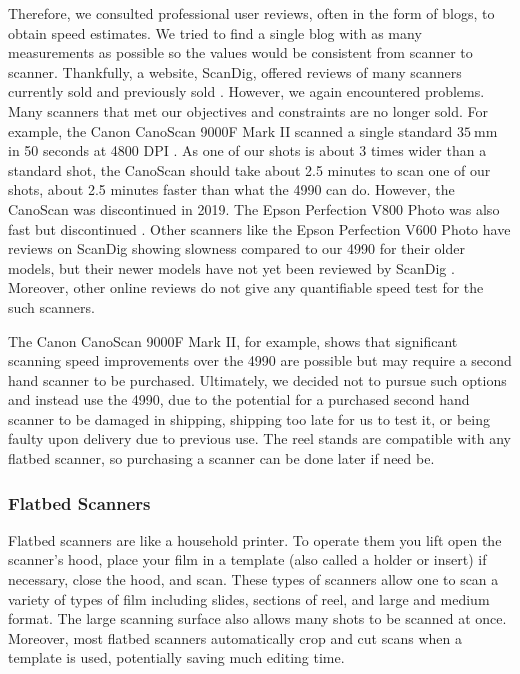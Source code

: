 \documentclass[12pt]{article} %
\begin{document}
Therefore, we consulted professional user reviews, often in the form of blogs, to obtain speed estimates. We tried to find a single blog with as many measurements as possible so the values would be consistent from scanner to scanner. Thankfully, a website, ScanDig, offered reviews of many scanners currently sold and previously sold \cite{ScanDig}. However, we again encountered problems. Many scanners that met our objectives and constraints are no longer sold. For example, the Canon CanoScan 9000F Mark II scanned a single standard $35 \ \text{mm}$ in 50 seconds at 4800 DPI \cite{canoscanspeed}. As one of our shots is about 3 times wider than a standard shot, the CanoScan should take about 2.5 minutes to scan one of our shots, about 2.5 minutes faster than what the 4990 can do. However, the CanoScan was discontinued in 2019. The Epson Perfection V800 Photo was also fast but discontinued \cite{v800scandig}. Other scanners like the Epson Perfection V600 Photo have reviews on ScanDig showing slowness compared to our 4990 for their older models, but their newer models have not yet been reviewed by ScanDig \cite{v600scandig}. Moreover, other online reviews do not give any quantifiable speed test for the such scanners.

The Canon CanoScan 9000F Mark II, for example, shows that significant scanning speed improvements over the 4990 are possible but may require a second hand scanner to be purchased. Ultimately, we decided not to pursue such options and instead use the 4990, due to the potential for a purchased second hand scanner to be damaged in shipping, shipping too late for us to test it, or being faulty upon delivery due to previous use. The reel stands are compatible with any flatbed scanner, so purchasing a scanner can be done later if need be.

\subsubsection{Flatbed Scanners}
Flatbed scanners are like a household printer. To operate them you lift open the scanner’s hood, place your film in a  template (also called a holder or insert) if necessary, close the hood, and scan. These types of scanners allow one to scan a variety of types of film including slides, sections of reel, and large and medium format. The large scanning surface also allows many shots to be scanned at once. Moreover, most flatbed scanners automatically crop and cut scans when a template is used, potentially saving much editing time.
\end{document}
